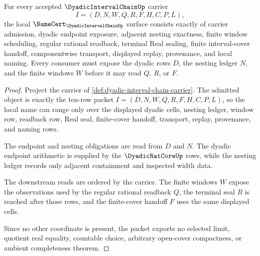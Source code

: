 \begin{theorem}
\label{thm:dyadic-interval-chain-namecert-obligations}
For every accepted $\DyadicIntervalChainUp$ carrier
$$
I=(D,N,W,Q,R,F,H,C,P,L),
$$
the local $\NameCert_{\DyadicIntervalChainUp}$ surface consists exactly of carrier admission, dyadic endpoint exposure, adjacent nesting exactness, finite window scheduling, regular rational readback, terminal Real sealing, finite interval-cover handoff, componentwise transport, displayed replay, provenance, and local naming. Every consumer must expose the dyadic rows $D$, the nesting ledger $N$, and the finite windows $W$ before it may read $Q$, $R$, or $F$.
\end{theorem}
\begin{proof}
Project the carrier of \autoref{def:dyadic-interval-chain-carrier}. The admitted object is exactly the ten-row packet $I=(D,N,W,Q,R,F,H,C,P,L)$, so the local name can range only over the displayed dyadic cells, nesting ledger, window row, readback row, Real seal, finite-cover handoff, transport, replay, provenance, and naming rows.

The endpoint and nesting obligations are read from $D$ and $N$. The dyadic endpoint arithmetic is supplied by the $\DyadicRatCoreUp$ rows, while the nesting ledger records only adjacent containment and inspected width data.

The downstream reads are ordered by the carrier. The finite windows $W$ expose the observations used by the regular rational readback $Q$, the terminal seal $R$ is reached after those rows, and the finite-cover handoff $F$ uses the same displayed cells.

Since no other coordinate is present, the packet exports no selected limit, quotient real equality, countable choice, arbitrary open-cover compactness, or ambient completeness theorem.
\end{proof}

